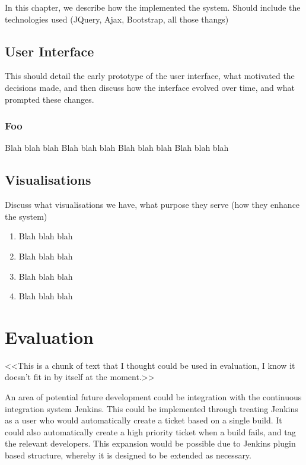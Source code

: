\documentclass[a4paper]{l3proj}
\begin{document}
In this chapter, we describe how the implemented the system.  Should include the technologies used (JQuery, Ajax, Bootstrap, all those thangs)

\section{User Interface}

This should detail the early prototype of the user interface, what motivated the decisions made, and then discuss how the interface
evolved over time, and what prompted these changes.

\subsection{Foo}

Blah blah blah
Blah blah blah
Blah blah blah
Blah blah blah

\section{Visualisations}

Discuss what visualisations we have, what purpose they serve (how they enhance the system)	
	
\begin{enumerate}
\item Blah blah blah
\item Blah blah blah
\item Blah blah blah
\item Blah blah blah
\end{enumerate}



\chapter{Evaluation}

<<This is a chunk of text that I thought could be used in evaluation, I know it doesn't fit in by itself at the moment.>>

An area of potential future development could be integration with the continuous integration system Jenkins.  This 
could be implemented through treating Jenkins as a user who would automatically create a ticket based on a single build.  
It could also automatically create a high priority ticket when a build fails, and tag the relevant developers.  This 
expansion would be possible due to Jenkins plugin based structure, whereby it is designed to be extended as necessary.
\end{document}
